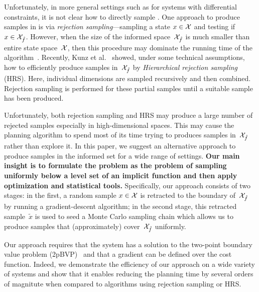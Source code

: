 \documentclass[letterpaper, 10 pt, conference]{ieeeconf}  %
\begin{document}
Unfortunately, in more general settings such as
for systems with differential constraints,
it is not clear how to directly sample \Cinf.
%
One approach to produce samples in \Cinf is via \emph{rejection sampling}---sampling a state $x \in \mathcal{X}$ and testing if $x \in \mathcal{X}_{\hat{f}}$.
However, when the size of the informed space~$\mathcal{X}_{\hat{f}}$ is much smaller than entire state space~$\mathcal{X}$, then this procedure may dominate the running time of the algorithm~\cite{KTC16}.
Recently, Kunz et al.~\cite{KTC16} showed, under some technical assumptions, how to efficiently produce samples in~$\mathcal{X}_{\hat{f}}$ by \emph{Hierarchical rejection sampling} (HRS). 
Here, individual dimensions are sampled recursively 
and then combined. Rejection sampling is performed for these partial samples until a suitable sample has been produced. 

Unfortunately, both rejection sampling and HRS may produce a large number of rejected samples especially in high-dimensional spaces.
This may cause the planning algorithm to spend most of its time trying to produces samples in~$\mathcal{X}_{\hat{f}}$ rather than explore it.
In this paper, we suggest an alternative approach to produce samples in the informed set \Cinf for a wide range of settings.
\textbf{Our main insight is to formulate the problem as the problem of sampling uniformly below a level set of an implicit function and then apply optimization and statistical tools.}
Specifically, our approach consists of two stages:
in the first, a random sample $x \in \mathcal{X}$ is retracted to the boundary of~$\mathcal{X}_{\hat{f}}$ by running a gradient-descent algorithm;
in the second stage, this retracted sample~$\tilde{x}$ is used to seed a Monte Carlo sampling chain which allows us to  produce samples that (approximately) cover~$\mathcal{X}_{\hat{f}}$  uniformly.

Our approach requires that the system has a solution to the two-point boundary value problem (2pBVP)~\cite{L06, H02} and that a gradient can be defined over the cost function.
Indeed, we demonstrate the efficiency of our approach on a wide variety of systems and show that it enables reducing the planning time by several orders of magnitute when compared to algorithms using rejection sampling or HRS.


%
\end{document}
